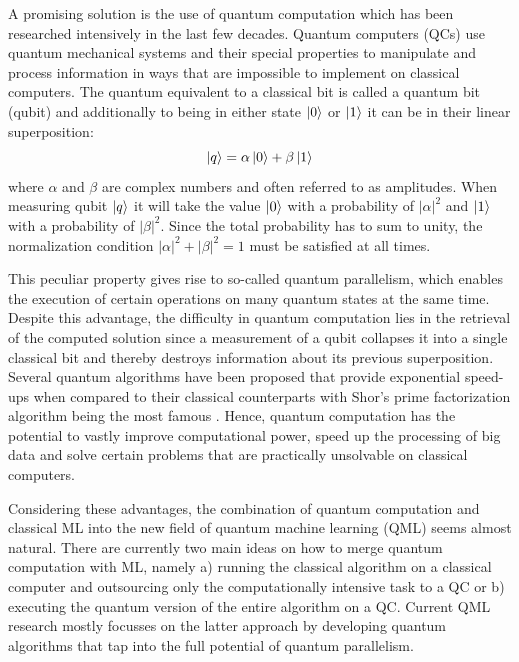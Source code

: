 \documentclass[a4paper]{article}
\newcommand*{\0}{$\ket{0}$}
\newcommand*{\1}{$\ket{1}$}
\begin{document}
A promising solution is the use of quantum computation which has been researched intensively in the last few decades. Quantum computers (QCs) use quantum mechanical systems and their special properties to manipulate and process information in ways that are impossible to implement on classical computers. The quantum equivalent to a classical bit is called a quantum bit (qubit) and additionally to being in either state \0 or \1 it can be in their linear superposition:
\begin{equation}
\label{equ: simplequbit}
\ket{q} = \alpha \ket{0} + \beta \ket{1}
\end{equation}
where $\alpha$ and $\beta$ are complex numbers and often referred to as amplitudes. When measuring qubit $\ket{q}$ it will take the value \0 with a probability of ${|\alpha|}^{2}$ and \1 with a probability of ${|\beta|}^{2}$. Since the total probability has to sum to unity, the normalization condition ${|\alpha|}^{2} + {|\beta|}^{2} =  1$ must be satisfied at all times.

This peculiar property gives rise to so-called quantum parallelism, which enables the execution of certain operations on many quantum states at the same time. Despite this advantage, the difficulty in quantum computation lies in the retrieval of the computed solution since a measurement of a qubit collapses it into a single classical bit and thereby destroys information about its previous superposition. Several quantum algorithms have been proposed that provide exponential speed-ups when compared to their classical counterparts with Shor's prime factorization algorithm being the most famous \citep{shor1994}.
Hence, quantum computation has the potential to vastly improve computational power, speed up the processing of big data and solve certain problems that are practically unsolvable on classical computers. 


Considering these advantages, the combination of quantum computation and classical ML into the new field of quantum machine learning (QML) seems almost natural. There are currently two main ideas on how to merge quantum computation with ML, namely a) running the classical algorithm on a classical computer and outsourcing only the computationally intensive task to a QC or b) executing the quantum version of the entire algorithm on a QC. Current QML research mostly focusses on the latter approach by developing quantum algorithms that tap into the full potential of quantum parallelism.
\end{document}
